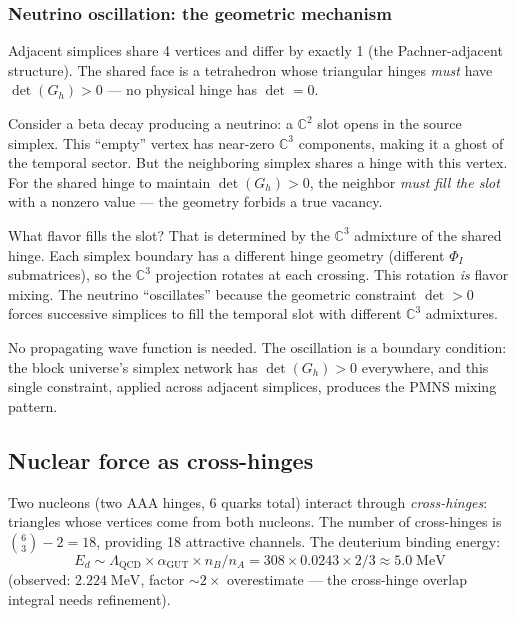 \documentclass[12pt]{article}
\theoremstyle{remark}
\theoremstyle{definition}
\newcommand{\CC}{\mathbb{C}}
\begin{document}
\subsubsection{Neutrino oscillation: the geometric mechanism}

Adjacent simplices share 4 vertices and differ by exactly 1 (the Pachner-adjacent structure). The shared face is a tetrahedron whose triangular hinges \emph{must} have $\det(G_h) > 0$ --- no physical hinge has $\det = 0$.

Consider a beta decay producing a neutrino: a $\CC^2$ slot opens in the source simplex. This ``empty'' vertex has near-zero $\CC^3$ components, making it a ghost of the temporal sector. But the neighboring simplex shares a hinge with this vertex. For the shared hinge to maintain $\det(G_h) > 0$, the neighbor \emph{must fill the slot} with a nonzero value --- the geometry forbids a true vacancy.

What flavor fills the slot? That is determined by the $\CC^3$ admixture of the shared hinge. Each simplex boundary has a different hinge geometry (different $\Phi_I$ submatrices), so the $\CC^3$ projection rotates at each crossing. This rotation \emph{is} flavor mixing. The neutrino ``oscillates'' because the geometric constraint $\det > 0$ forces successive simplices to fill the temporal slot with different $\CC^3$ admixtures.

No propagating wave function is needed. The oscillation is a boundary condition: the block universe's simplex network has $\det(G_h) > 0$ everywhere, and this single constraint, applied across adjacent simplices, produces the PMNS mixing pattern.

\subsection{Nuclear force as cross-hinges}

Two nucleons (two AAA hinges, 6 quarks total) interact through \emph{cross-hinges}: triangles whose vertices come from both nucleons. The number of cross-hinges is $\binom{6}{3} - 2 = 18$, providing 18 attractive channels. The deuterium binding energy:
\begin{equation}
E_d \sim \Lambda_\text{QCD} \times \alpha_\text{GUT} \times n_B/n_A = 308 \times 0.0243 \times 2/3 \approx 5.0\;\text{MeV}
\end{equation}
(observed: $2.224\;\text{MeV}$, factor $\sim 2\times$ overestimate --- the cross-hinge overlap integral needs refinement).
\end{document}
